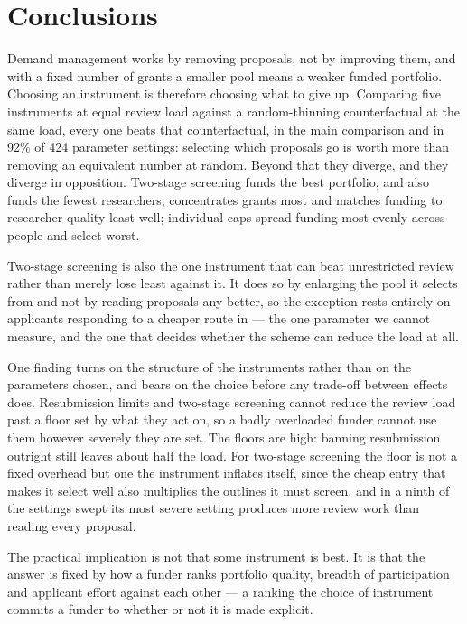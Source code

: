 \documentclass[11pt,a4paper]{article}
\begin{document}
\section{Conclusions}

Demand management works by removing proposals, not by improving them, and with a
fixed number of grants a smaller pool means a weaker funded portfolio. Choosing an
instrument is therefore choosing what to give up. Comparing five instruments at
equal review load against a random-thinning counterfactual at the same load, every
one beats that counterfactual, in the main comparison and in 92\% of 424
parameter settings: selecting which proposals go is worth more than removing an
equivalent number at random. Beyond that they diverge, and they diverge in
opposition. Two-stage screening funds the best portfolio, and also funds the
fewest researchers, concentrates grants most and matches funding to researcher
quality least well; individual caps spread funding most evenly across people and
select worst.

Two-stage screening is also the one instrument that can beat unrestricted review
rather than merely lose least against it. It does so by enlarging the pool it
selects from and not by reading proposals any better, so the exception rests
entirely on applicants responding to a cheaper route in --- the one parameter we
cannot measure, and the one that decides whether the scheme can reduce the load at
all.

One finding turns on the structure of the instruments rather than on the
parameters chosen, and bears on the choice before any trade-off between effects
does. Resubmission limits and two-stage screening cannot reduce the review load
past a floor set by what they act on, so a badly overloaded funder cannot use
them however severely they are set. The floors are high: banning resubmission
outright still leaves about half the load. For two-stage screening the floor is
not a fixed overhead but one the instrument inflates itself, since the cheap entry
that makes it select well also multiplies the outlines it must screen, and in a
ninth of the settings swept its most severe setting produces more review work
than reading every proposal.

The practical implication is not that some instrument is best. It is that the
answer is fixed by how a funder ranks portfolio quality, breadth of participation
and applicant effort against each other --- a ranking the choice of instrument
commits a funder to whether or not it is made explicit.
\end{document}
